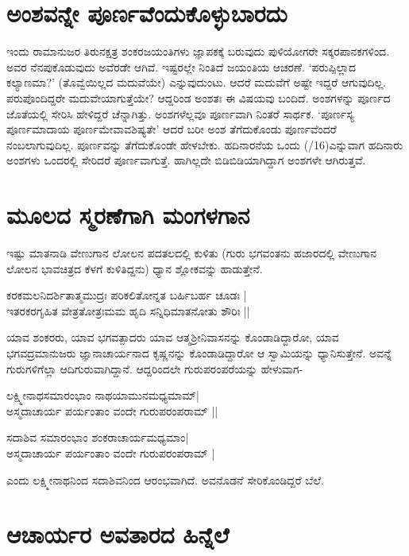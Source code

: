 \section*{ಅಂಶವನ್ನೇ ಪೂರ್ಣವೆಂದುಕೊಳ್ಳುಬಾರದು}

ಇಂದು ರಾಮಾನುಜರ ತಿರುನಕ್ಷತ್ರ ಶಂಕರಜಯಂತಿಗಳು ಜ್ಞಾಪಕಕ್ಕೆ ಬರುವುದು ಪುಳಿಯೋಗರೇ ಸಕ್ಕರಪಾನಕಗಳಿಂದ. ಅವರ ನೆನಪುಕೊಡುವುದು ಅವೆರಡೇ ಆಗಿವೆ. ಇಷ್ಟರಲ್ಲೇ ನಿಂತಿದೆ ಜಯಂತಿಯ ಆಚರಣೆ. `ಪರುಪ್ಪಿಲ್ಲಾದ ಕಲ್ಯಾಣಮಾ?' (ತೊವ್ವೆಯಿಲ್ಲದ ಮದುವೆಯೇ) ಎನ್ನುವುದುಂಟು. ಆದರೆ ಮದುವೆಗೆ ಅಷ್ಟೇ ಇದ್ದರೆ ಆಗುವುದಿಲ್ಲ. ಪರುಪೊಂದಿದ್ದರೇ ಮದುವೇಯಾಗುತ್ತೆಯೇ? ಆದ್ದರಿಂಡ ಅಂಶತಃ ಈ ವಿಷಯವು ಬಂದಿದೆ. ಅಂಶಗಳನ್ನು  ಪೂರ್ಣದ ಜೊತೆಯಲ್ಲಿ ಸೇರಿಸಿ ಹೇಳಿದ್ದರೆ ಚೆನ್ನಾಗಿತ್ತು. ಅಂಶಗಳೆಲ್ಲವೂ ಪೂರ್ಣವಾಗಿ ನಿಂತರೆ ಸಾರ್ಥಕ. `ಪೂರ್ಣಸ್ಯ ಪೂರ್ಣಮಾದಾಯ\label{48a} ಪೂರ್ಣಮೇವಾವಶಿಷ್ಯತೇ' ಆದರೆ ಬರೀ ಅಂಶ ತೆಗೆದುಕೊಂಡು ಪೂರ್ಣವೆಂದರೆ ನಂಬಲಾಗುವುದಿಲ್ಲ. ಪೂರ್ಣವನ್ನು ತೆಗೆದುಕೊಂಡೇ ಹೇಳಬೇಕು. ಹದಿನಾರನೆಯ ಒಂದು {(/16)}ಎನ್ನುವಾಗ ಹದಿನಾರು ಅಂಶಗಳು ಒಂದರಲ್ಲಿ ಸೇರಿದರೆ ಪೂರ್ಣವಾಗುತ್ತೆ. ಹಾಗಿಲ್ಲದೇ ಬಿಡಿಬಿಡಿಯಾಗಿದ್ದಾಗ ಅಂಶಗಳೇ ಆಗಿರುತ್ತವೆ.

\section*{ಮೂಲದ ಸ್ಮರಣೆಗಾಗಿ ಮಂಗಳಗಾನ}

ಇಷ್ಟು ಮಾತನಾಡಿ ವೇಣುಗಾನ ಲೋಲನ ಪದತಲದಲ್ಲಿ ಕುಳಿತು (ಗುರು ಭಗವಂತನು ಹಜಾರದಲ್ಲಿ ವೇಣುಗಾನ ಲೋಲನ ಭಾವಚಿತ್ರದ ಕೆಳಗೆ ಕುಳಿತಿದ್ದನು) ಧ್ಯಾನ ಶ್ಲೋಕವನ್ನು ಹಾಡುತ್ತೇನೆ.

\begin{shloka}
ಕರಕಮಲನಿದರ್ಶಿತಾತ್ಮಮುದ್ರಃ ಪರಿಕಲಿತೋನ್ನತ ಬರ್ಹಿಬರ್ಹ ಚೂಡಃ |\label{48}\\%
ಇತರಕರಗೃಹಿತ ವೇತ್ರತೋತ್ರಃಮಮ ಹೃದಿ ಸನ್ನಿಧಿಮಾತನೋತು ಶೌರಿಃ ||
\end{shloka}

ಯಾವ ಶಂಕರರು, ಯಾವ ಭಗವತ್ಪಾದರು ಯಾವ ಆತ್ಮಶ್ರೀನಿವಾಸನನ್ನು ಕೊಂಡಾಡಿದ್ದಾರೋ, ಯಾವ ಭಗವದ್ರಮಾನುಜರು ಜ್ಞಾನಾಚಾರ್ಯನಾದ ಕೃಷ್ಣನನ್ನು ಕೊಂಡಾಡಿದ್ದಾರೋ ಆ ಸ್ವಾಮಿಯನ್ನು ಧ್ಯಾನಿಸುತ್ತೇನೆ. ಅವನ್ನೆ ಗುರುಗಳಿಗೆಲ್ಲಾ ಆದಿಗುರುವಾಗಿದ್ದಾನೆ. ಆದ್ದರಿಂದಲೇ ಗುರುಪರಂಪರೆಯನ್ನು ಹೇಳುವಾಗ-

\begin{shloka}
ಲಕ್ಷ್ಮೀನಾಥಸಮಾರಂಭಾಂ ನಾಥಯಾಮುನಮಧ್ಯಮಾಮ್|\\
ಅಸ್ಮದಾಚಾರ್ಯ ಪರ್ಯಂತಾಂ ವಂದೇ ಗುರುಪರಂಪರಾಮ್ ||
\end{shloka}

\begin{shloka}
ಸದಾಶಿವ ಸಮಾರಂಭಾಂ ಶಂಕರಾಚಾರ್ಯಮಧ್ಯಮಾಂ|\\
ಅಸ್ಮದಾಚಾರ್ಯ ಪರ್ಯಂತಾಂ ವಂದೇ ಗುರುಪರಂಪರಾಮ್ |
\end{shloka}
ಎಂದು ಲಕ್ಷ್ಮೀನಾಥನಿಂದ ಸದಾಶಿವನಿಂದ ಆರಂಭವಾಗಿದೆ. ಅವನೊಡನೆ ಸೇರಿಕೊಂಡಿದ್ದರೆ ಬೆಲೆ.

\section*{ಆಚಾರ್ಯರ ಅವತಾರದ ಹಿನ್ನೆಲೆ}

